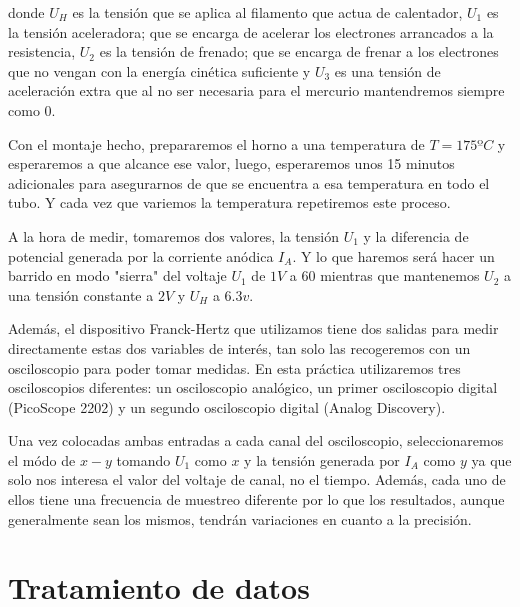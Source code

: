 \documentclass[11pt, a4paper, twocolumn]{article}
\begin{document}
donde $U_H$ es la tensión que se aplica al filamento que actua de calentador, $U_1$
es la tensión aceleradora; que se encarga de acelerar los electrones arrancados a 
la resistencia, $U_2$ es la tensión de frenado; que se encarga de frenar a los 
electrones que no vengan con la energía cinética suficiente y $U_3$ es una tensión 
de aceleración extra que al no ser necesaria para el mercurio mantendremos siempre 
como 0.

\vspace{0.2cm}

Con el montaje hecho, prepararemos el horno a una temperatura de $T=175ºC$ y 
esperaremos a que alcance ese valor, luego, esperaremos unos 15 minutos adicionales 
para asegurarnos de que se encuentra a esa temperatura en todo el tubo. Y cada vez 
que variemos la temperatura repetiremos este proceso.

\vspace{0.2cm}

A la hora de medir, tomaremos dos valores, la tensión $U_1$ y la diferencia 
de potencial generada por la corriente anódica $I_A$. Y lo que haremos será 
hacer un barrido en modo "sierra" del voltaje $U_1$ de $1V$ a $60$ mientras 
que mantenemos $U_2$ a una tensión constante a $2V$ y $U_H$ a $6.3 v$.

\vspace{0.2cm}

Además, el dispositivo Franck-Hertz que utilizamos tiene dos salidas para 
medir directamente estas dos variables de interés, tan solo las recogeremos 
con un osciloscopio para poder tomar medidas. En esta práctica utilizaremos 
tres osciloscopios diferentes: un osciloscopio analógico, un primer osciloscopio 
digital (PicoScope 2202) y un segundo osciloscopio digital (Analog Discovery).

\vspace{0.2cm}

Una vez colocadas ambas entradas a cada canal del osciloscopio, seleccionaremos 
el módo de $x-y$ tomando $U_1$ como $x$ y la tensión generada por $I_A$ como $y$ 
ya que solo nos interesa el valor del voltaje de canal, no 
el tiempo. Además, cada uno de ellos tiene una frecuencia de muestreo diferente por lo que 
los resultados, aunque generalmente sean los mismos, tendrán variaciones 
en cuanto a la precisión. 

\section{Tratamiento de datos}
\end{document}
